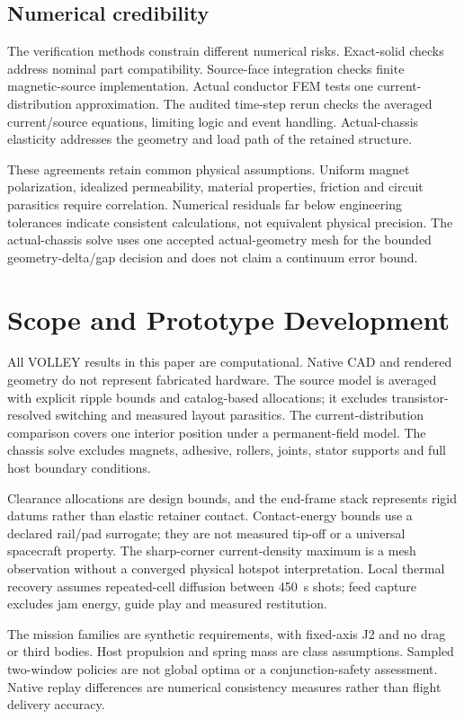 \documentclass[conference,a4paper]{IEEEtran}
\begin{document}
\subsection{Numerical credibility}
The verification methods constrain different numerical risks. Exact-solid checks address nominal part compatibility. Source-face integration checks finite magnetic-source implementation. Actual conductor FEM tests one current-distribution approximation. The audited time-step rerun checks the averaged current/source equations, limiting logic and event handling. Actual-chassis elasticity addresses the geometry and load path of the retained structure.

These agreements retain common physical assumptions. Uniform magnet polarization, idealized permeability, material properties, friction and circuit parasitics require correlation. Numerical residuals far below engineering tolerances indicate consistent calculations, not equivalent physical precision. The actual-chassis solve uses one accepted actual-geometry mesh for the bounded geometry-delta/gap decision and does not claim a continuum error bound.

\section{Scope and Prototype Development}
All VOLLEY results in this paper are computational. Native CAD and rendered geometry do not represent fabricated hardware. The source model is averaged with explicit ripple bounds and catalog-based allocations; it excludes transistor-resolved switching and measured layout parasitics. The current-distribution comparison covers one interior position under a permanent-field model. The chassis solve excludes magnets, adhesive, rollers, joints, stator supports and full host boundary conditions.

Clearance allocations are design bounds, and the end-frame stack represents rigid datums rather than elastic retainer contact. Contact-energy bounds use a declared rail/pad surrogate; they are not measured tip-off or a universal spacecraft property. The sharp-corner current-density maximum is a mesh observation without a converged physical hotspot interpretation. Local thermal recovery assumes repeated-cell diffusion between 450~s shots; feed capture excludes jam energy, guide play and measured restitution.

The mission families are synthetic requirements, with fixed-axis J2 and no drag or third bodies. Host propulsion and spring mass are class assumptions. Sampled two-window policies are not global optima or a conjunction-safety assessment. Native replay differences are numerical consistency measures rather than flight delivery accuracy.
\end{document}
